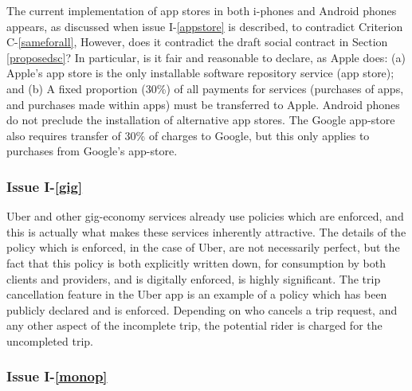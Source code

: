 The current implementation of app stores in both i-phones and Android
phones appears, as discussed when issue I-\ref{appstore} is described,
to contradict Criterion C-\ref{sameforall}, However, does it contradict
the draft social contract in Section \ref{proposedsc}?
%
In particular, is it fair and reasonable to declare, as Apple does:
(a) Apple's app store is the only installable software repository
service (app store); and
(b) A fixed proportion (30\%) of all payments for services (purchases
of apps, and purchases made within apps) must be transferred to Apple.
% 
% 
Android phones do not preclude the installation of alternative
app stores. The Google app-store also requires transfer of 30\% of
charges to Google, but this only applies to purchases from Google's
app-store.

\subsubsection*{Issue I-\ref{gig}}\label{gigsol}
%
Uber and other gig-economy services already use policies which are
enforced, and this is actually what makes these services inherently
attractive. The details of the policy which is enforced, in the case of
Uber, are not necessarily perfect, but the fact that this policy is both
explicitly written down, for consumption by both clients and providers,
and is digitally enforced, is highly significant.
%
The trip cancellation feature in the Uber app is an example of a
policy which has been publicly declared and is enforced.
Depending on who cancels a trip request, and any other aspect of
the incomplete trip, the potential rider is charged for the uncompleted trip.



\subsubsection*{Issue I-\ref{monop}}\label{monopsol}

